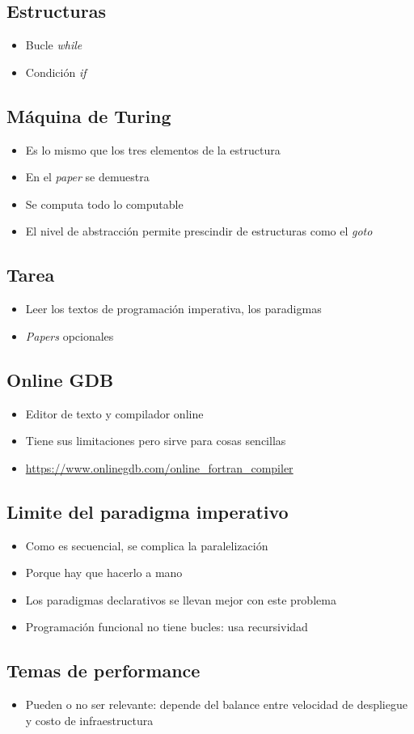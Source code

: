 \subsection{Estructuras}
\begin{itemize}
    \item Bucle \textit{while}
    \item Condición \textit{if}
\end{itemize}

\subsection{Máquina de Turing}
\begin{itemize}
    \item Es lo mismo que los tres elementos de la estructura 
    \item En el \textit{paper} se demuestra
    \item Se computa todo lo computable
    \item El nivel de abstracción permite prescindir de estructuras como el \textit{goto}
\end{itemize}

\subsection{Tarea}
\begin{itemize}
    \item Leer los textos de programación imperativa, los paradigmas
    \item \textit{Papers} opcionales
\end{itemize}

\subsection{Online GDB}
\begin{itemize}
    \item Editor de texto y compilador online
    \item Tiene sus limitaciones pero sirve para cosas sencillas
    \item \url{https://www.onlinegdb.com/online_fortran_compiler}
\end{itemize}

\subsection{Limite del paradigma imperativo}
\begin{itemize}
    \item Como es secuencial, se complica la paralelización 
    \item Porque hay que hacerlo a mano 
    \item Los paradigmas declarativos se llevan mejor con este problema
    \item Programación funcional no tiene bucles: usa recursividad
\end{itemize}

\subsection{Temas de performance}
\begin{itemize}
    \item Pueden o no ser relevante: 
    depende del balance entre velocidad de despliegue y costo de infraestructura
\end{itemize}